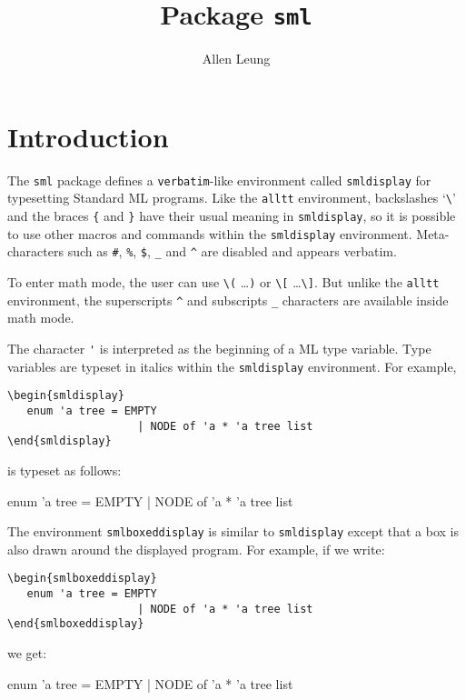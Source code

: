   \usepackage{sml}
  \title{Package {\tt sml}}
  \author{Allen Leung}

  \maketitle
\section{Introduction}
  The \verb|sml| package defines a \verb|verbatim|-like environment
called \verb|smldisplay|
for typesetting Standard ML programs.   
Like the \verb|alltt| environment, 
backslashes `\verb|\|' and the braces \verb|{|
and \verb|}| have their usual meaning in \verb|smldisplay|, 
so it is possible to use other
macros and commands within the \verb|smldisplay| environment.
Meta-characters such as \verb|#|, \verb|%|, 
\verb|$|, \verb|_| and \verb|^| are disabled and appears verbatim.  

To enter math mode, the user can use \verb|\(| \ldots \verb|)| or
\verb|\[| \ldots \verb|\]|.  But unlike the \verb|alltt| environment,
the superscripts \verb|^| and subscripts \verb|_| characters
are available inside math mode. 

The character \verb|'| is interpreted as the beginning of a ML 
type variable.  Type variables are typeset 
in italics within the \verb|smldisplay| environment.  For example, 
\begin{verbatim}
\begin{smldisplay} 
   enum 'a tree = EMPTY
                    | NODE of 'a * 'a tree list
\end{smldisplay}
\end{verbatim}
is typeset as follows:
\begin{smldisplay} 
   enum 'a tree = EMPTY 
                    | NODE of 'a * 'a tree list
\end{smldisplay}

The environment \verb|smlboxeddisplay| is similar to \verb|smldisplay|
except that a box is also drawn around the displayed program.
For example, if we write:
\begin{verbatim}
\begin{smlboxeddisplay} 
   enum 'a tree = EMPTY 
                    | NODE of 'a * 'a tree list
\end{smlboxeddisplay}
\end{verbatim}
we get:
\begin{smlboxeddisplay} 
   enum 'a tree = EMPTY 
                    | NODE of 'a * 'a tree list
\end{smlboxeddisplay}

